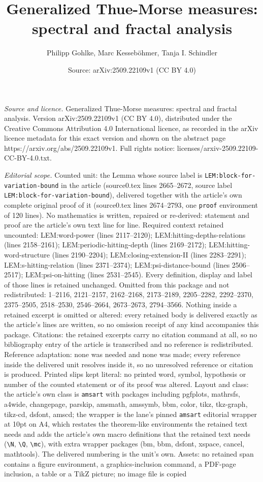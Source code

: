 \documentclass[10pt,a4paper]{amsart}
\title[Generalized Thue-Morse measures: spectral and fractal analys]{Generalized Thue-Morse measures: spectral and fractal analysis}
\author{Philipp Gohlke, Marc Kesseb\"ohmer, Tanja I. Schindler}
\date{Source: arXiv:2509.22109v1 (CC BY 4.0)}
\begin{document}
\maketitle

\noindent\emph{Source and licence.} Generalized Thue-Morse measures: spectral and fractal analysis. Version arXiv:2509.22109v1 (CC BY 4.0), distributed under the Creative Commons Attribution 4.0 International licence, as recorded in the arXiv licence metadata for this exact version and shown on the abstract page https://arxiv.org/abs/2509.22109v1. Full rights notice: licenses/arxiv-2509.22109-CC-BY-4.0.txt.\par\smallskip

\noindent\textit{Editorial scope.} Counted unit: the Lemma whose source label is \texttt{LEM:block-for-variation-bound} in the article (source0.tex lines 2665--2672, source label \texttt{LEM:block-for-variation-bound}), delivered together with the article's own complete original proof of it (source0.tex lines 2674--2793, one \texttt{proof} environment of 120 lines). No mathematics is written, repaired or re-derived: statement and proof are the article's own text line for line. Required context retained uncounted: LEM:word-power (lines 2117--2120); LEM:hitting-depths-relations (lines 2158--2161); LEM:periodic-hitting-depth (lines 2169--2172); LEM:hitting-word-structure (lines 2190--2204); LEM:closing-extension-II (lines 2283--2291); LEM:s-hitting-relation (lines 2371--2374); LEM:psi-distance-bound (lines 2506--2517); LEM:psi-on-hitting (lines 2531--2545). Every definition, display and label of those lines is retained unchanged. Omitted from this package and not redistributed: 1--2116, 2121--2157, 2162--2168, 2173--2189, 2205--2282, 2292--2370, 2375--2505, 2518--2530, 2546--2664, 2673--2673, 2794--3566. Nothing inside a retained excerpt is omitted or altered: every retained body is delivered exactly as the article's lines are written, so no omission receipt of any kind accompanies this package. Citations: the retained excerpts carry no citation command at all, so no bibliography entry of the article is transcribed and no reference is redistributed. Reference adaptation: none was needed and none was made; every reference inside the delivered unit resolves inside it, so no unresolved reference or citation is produced. Printed slips kept literal: no printed word, symbol, hypothesis or number of the counted statement or of its proof was altered. Layout and class: the article's own class is \texttt{amsart} with packages including pgfplots, mathrsfs, a4wide, changepage, parskip, amsmath, amssymb, bbm, color, tikz, tkz-graph, tikz-cd, dsfont, amscd; the wrapper is the lane's pinned \texttt{amsart} editorial wrapper at 10pt on A4, which restates the theorem-like environments the retained text needs and adds the article's own macro definitions that the retained text needs (\texttt{\textbackslash N}, \texttt{\textbackslash Q}, \texttt{\textbackslash mc}), with extra wrapper packages (bm, bbm, dsfont, xspace, cancel, mathtools). The delivered numbering is the unit's own. Assets: no retained span contains a figure environment, a graphics-inclusion command, a PDF-page inclusion, a table or a TikZ picture; no image file is copied 
\end{document}
